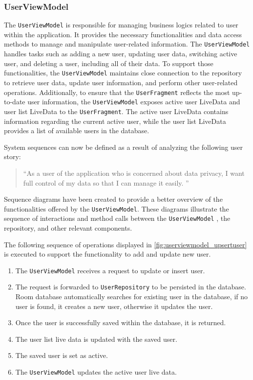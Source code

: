 \subsubsection{UserViewModel}
\label{chap:userviewmodel_design}
The \texttt{UserViewModel} is responsible for managing business logics related to user within the application.
It provides the necessary functionalities and data access methods to manage and manipulate user-related information. 
The \texttt{UserViewModel} handles tasks such as adding a new user, updating user data, switching active user, and deleting a user, including all of their data.
To support those functionalities, the \texttt{UserViewModel} maintains close connection to the repository to retrieve user data, update user information, and perform other user-related operations. 
Additionally, to ensure that the \texttt{UserFragment} reflects the most up-to-date user information, the \texttt{UserViewModel} exposes active user LiveData and user list LiveData to the \texttt{UserFragment}.
The active user LiveData contains information regarding the current active user, while the user list LiveData provides a list of available users in the database.

System sequences can now be defined as a result of analyzing the following user story:
\begin{quotation}
    \enquote{As a user of the application who is concerned about data privacy, I want full control of my data so that I can manage it easily. }
\end{quotation}
Sequence diagrams have been created to provide a better overview of the functionalities offered by the \texttt{UserViewModel}. These diagrams illustrate the sequence of interactions and method calls between the \texttt{UserViewModel} , the repository, and other relevant components.

The following sequence of operations displayed in \autoref{fig:userviewmodel_upsertuser} is executed to support the functionality to add and update new user.
\begin{enumerate}
    \item The \texttt{UserViewModel} receives a request to update or insert user.
    \item The request is forwarded to \texttt{UserRepository} to be persisted in the database. Room database automatically searches for existing user in the database, if no user is found, it creates a new user, otherwise it updates the user.
    \item Once the user is successfully saved within the database, it is returned.
    \item The user list live data is updated with the saved user.
    \item The saved user is set as active.
    \item The \texttt{UserViewModel} updates the active user live data.
\end{enumerate}

